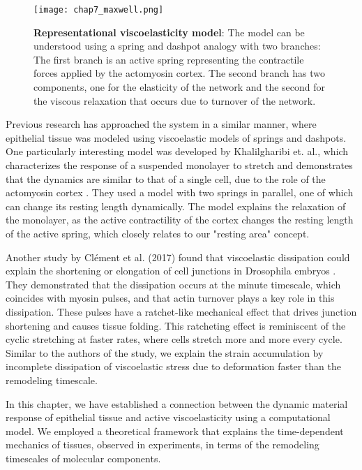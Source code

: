 \begin{figure}[b!]
	\centering
	\texttt{[image: chap7\_maxwell.png]}
	\caption{\label{fig_7_9} \textbf{Representational viscoelasticity model}: The model can be understood using a spring and dashpot analogy with two branches: The first branch is an active spring representing the contractile forces applied by the actomyosin cortex. The second branch has two components, one for the elasticity of the network and the second for the viscous relaxation that occurs due to turnover of the network.
	}
\end{figure}

Previous research has approached the system in a similar manner, where epithelial tissue was modeled using viscoelastic models of springs and dashpots. One particularly interesting model was developed by Khalilgharibi et. al., which characterizes the response of a suspended monolayer to stretch and demonstrates that the dynamics are similar to that of a single cell, due to the role of the actomyosin cortex 
\cite{khalilgharibi2019}. They used a model with two springs in parallel, one of which can change its resting length dynamically. The model explains the relaxation of the monolayer, as the active contractility of the cortex changes the resting length of the active spring, which closely relates to our "resting area" concept. 

Another study by Clément et al. (2017) found that viscoelastic dissipation could explain the shortening or elongation of cell junctions in Drosophila embryos \cite{clement2017}. They demonstrated that the dissipation occurs at the minute timescale, which coincides with myosin pulses, and that actin turnover plays a key role in this dissipation. These pulses have a ratchet-like mechanical effect that drives junction shortening and causes tissue folding. This ratcheting effect is reminiscent of the cyclic stretching at faster rates, where cells stretch more and more every cycle. Similar to the authors of the study, we explain the strain accumulation by incomplete dissipation of viscoelastic stress due to deformation faster than the remodeling timescale.

In this chapter, we have established a connection between the dynamic material response of epithelial tissue and active viscoelasticity using a computational model. We employed a theoretical framework that explains the time-dependent mechanics of tissues, observed in experiments, in terms of the remodeling timescales of molecular components.

